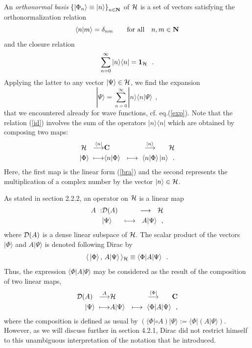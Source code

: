 \documentclass[12pt]{report}
\begin{document}
An {\em orthonormal basis} 
$\left\{ | \Phi_n \rangle \equiv |n\rangle \right\}_{n\in {\bf N}}$
 of ${\cal H}$ is a set of vectors satisfying the orthonormalization 
 relation 
 \begin{equation}
\langle n | m \rangle = \delta_{nm}
\qquad \mbox{for all} \quad n,m \in {\bf N}
\end{equation}
and the closure relation 
\begin{equation}
\label{id}
\sum_{n=0}^{\infty} | n \rangle \langle n | =  {\bf 1}_{{\cal H}}
\ \ .
\end{equation}
Applying the latter to any vector $| \Psi \rangle \in {\cal H}$, 
we find the expansion 
\[
| \Psi \rangle = \sum_{n=0}^{\infty} | n \rangle 
\langle n | \Psi \rangle
\ \ ,
\]
that we encountered 
already for wave functions, cf. eq.(\ref{exp}).
Note that the relation (\ref{id}) 
involves the sum of the operators 
$| n \rangle \langle n |$ 
which are obtained by composing two maps: 
\begin{eqnarray}
\label{de}
{\cal H} \ \ \stackrel{\langle n|}{\longrightarrow} & {\bf C}&
\stackrel{|n \rangle}{\longrightarrow} \quad \ \ {\cal H}
\\
| \Phi \rangle \ \longmapsto & \langle n | \Phi \rangle &
\longmapsto \
\langle n | \Phi \rangle \,  |n \rangle
\ \ .
\nonumber
\end{eqnarray}
Here, the first map is the linear form 
(\ref{bra}) and the second represents the multiplication of a complex
number by the vector $|n\rangle \in {\cal H}$.
 
As stated in section 2.2.2, 
an operator on ${\cal H}$ is a linear map 
\begin{eqnarray}
A \ : & {\cal D} (A) & \longrightarrow \ \ {\cal H}
\\
 & |\Psi \rangle & \longmapsto \ \
A | \Psi \rangle
\ \ ,
\nonumber
\end{eqnarray}
 where ${\cal D}(A)$ 
is a dense linear subspace of ${\cal H}$.
The scalar product of the vectors 
$|\Phi \rangle$ and $A | \Psi
\rangle$ is denoted following Dirac by 
\begin{equation}
\label{mat}
\langle \, | \Phi \rangle \, ,\, A|\Psi \rangle \, \rangle _{{\cal H}} \equiv
\langle \Phi | A | \Psi \rangle
\ \ .
\end{equation}
Thus, the expression $\langle \Phi | A | \Psi \rangle$ 
may be considered as the result of the 
composition of two linear maps, 
\begin{eqnarray}
\label{copo}
{\cal D} (A) \ \ \stackrel{A}{\longrightarrow} & {\cal H} &
\stackrel{\langle \Phi |}{\longrightarrow} \quad \ \ {\bf C}
\\
| \Psi \rangle \ \longmapsto & A | \Psi \rangle &
\longmapsto \
\langle \Phi | A | \Psi \rangle
\ \ ,
\nonumber
\end{eqnarray}
where the composition is defined as usual by 
$\left( \langle \Phi | \circ A \right)  | \Psi \rangle :=
\langle \Phi | \left(  A   | \Psi \rangle \right)$.
However, as we will discuss further in section 4.2.1,
Dirac did not restrict himself to 
this unambiguous 
interpretation of the notation 
that he introduced.
\end{document}
